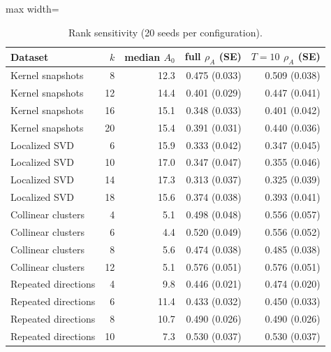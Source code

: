 \begin{table}[t]
\centering\small
\caption{Rank sensitivity (20 seeds per configuration).}\label{tab:rank}
\begin{adjustbox}{max width=\linewidth}
\begin{tabular}{lrrrr}
\toprule
Dataset & $k$ & median $A_0$ & full $\rho_A$ (SE) & $T{=}10$ $\rho_A$ (SE) \\
\midrule
Kernel snapshots & 8 & 12.3 & 0.475 (0.033) & 0.509 (0.038) \\
Kernel snapshots & 12 & 14.4 & 0.401 (0.029) & 0.447 (0.041) \\
Kernel snapshots & 16 & 15.1 & 0.348 (0.033) & 0.401 (0.042) \\
Kernel snapshots & 20 & 15.4 & 0.391 (0.031) & 0.440 (0.036) \\
Localized SVD & 6 & 15.9 & 0.333 (0.042) & 0.347 (0.045) \\
Localized SVD & 10 & 17.0 & 0.347 (0.047) & 0.355 (0.046) \\
Localized SVD & 14 & 17.3 & 0.313 (0.037) & 0.325 (0.039) \\
Localized SVD & 18 & 15.6 & 0.374 (0.038) & 0.393 (0.041) \\
Collinear clusters & 4 & 5.1 & 0.498 (0.048) & 0.556 (0.057) \\
Collinear clusters & 6 & 4.4 & 0.520 (0.049) & 0.556 (0.052) \\
Collinear clusters & 8 & 5.6 & 0.474 (0.038) & 0.485 (0.038) \\
Collinear clusters & 12 & 5.1 & 0.576 (0.051) & 0.576 (0.051) \\
Repeated directions & 4 & 9.8 & 0.446 (0.021) & 0.474 (0.020) \\
Repeated directions & 6 & 11.4 & 0.433 (0.032) & 0.450 (0.033) \\
Repeated directions & 8 & 10.7 & 0.490 (0.026) & 0.490 (0.026) \\
Repeated directions & 10 & 7.3 & 0.530 (0.037) & 0.530 (0.037) \\
\bottomrule
\end{tabular}
\end{adjustbox}
\end{table}
